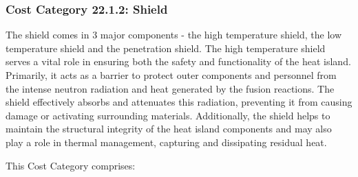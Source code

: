 
\subsubsection*{Cost Category 22.1.2: Shield}

The shield comes in 3 major components - the high temperature shield, the low temperature shield and the penetration shield. The high temperature shield serves a vital role in ensuring both the safety and functionality of the heat island. Primarily, it acts as a barrier to protect outer components and personnel from the intense neutron radiation and heat generated by the fusion reactions. The shield effectively absorbs and attenuates this radiation, preventing it from causing damage or activating surrounding materials. Additionally, the shield helps to maintain the structural integrity of the heat island components and may also play a role in thermal management, capturing and dissipating residual heat. 

This Cost Category comprises: 

